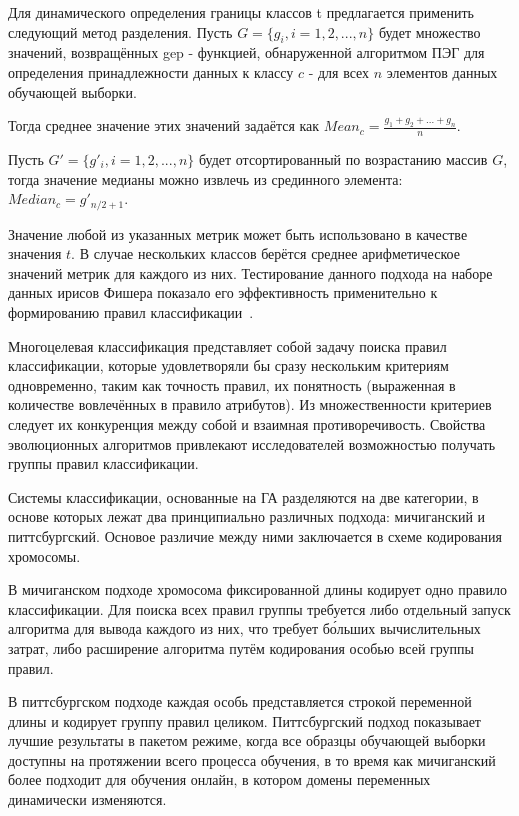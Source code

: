 Для динамического определения границы классов t предлагается применить следующий метод разделения. Пусть $G = \{g_i, i=1, 2, ..., n\}$ будет множество значений, возвращённых gep - функцией, обнаруженной алгоритмом ПЭГ для определения принадлежности данных к классу $c$ - для всех $n$ элементов данных обучающей выборки.

Тогда среднее значение этих значений задаётся как $Mean_c = \frac{g_1 + g_2 + ... + g_n}{n}$.

Пусть $G' = \{g'_i, i=1, 2, ..., n\}$ будет отсортированный по возрастанию массив $G$, тогда значение медианы можно извлечь из срединного элемента: $Median_c = g'_{n/2 + 1}$.

Значение любой из указанных метрик может быть использовано в качестве значения $t$. В случае нескольких классов берётся среднее арифметическое значений метрик для каждого из них. Тестирование данного подхода на наборе данных ирисов Фишера показало его эффективность применительно к формированию правил классификации~\cite{conf/adma/DuanTZWZ06}.

Многоцелевая классификация представляет собой задачу поиска правил классификации, которые удовлетворяли бы сразу нескольким критериям одновременно, таким как точность правил, их понятность (выраженная в количестве вовлечённых в правило атрибутов). Из множественности критериев следует их конкуренция между собой и взаимная противоречивость. Свойства эволюционных алгоритмов привлекают исследователей возможностью получать группы правил классификации.

Системы классификации, основанные на ГА разделяются на две категории, в основе которых лежат два принципиально различных подхода: мичиганский и питтсбургский. Основое различие между ними заключается в схеме кодирования хромосомы.

В мичиганском подходе хромосома фиксированной длины кодирует одно правило классификации. Для поиска всех правил группы требуется либо отдельный запуск алгоритма для вывода каждого из них, что требует б\'{о}льших вычислительных затрат, либо расширение алгоритма путём кодирования особью всей группы правил.

В питтсбургском подходе каждая особь представляется строкой переменной длины и кодирует группу правил целиком. Питтсбургский подход показывает лучшие результаты в пакетом режиме, когда все образцы обучающей выборки доступны на протяжении всего процесса обучения, в то время как мичиганский более подходит для обучения онлайн, в котором домены переменных динамически изменяются.

